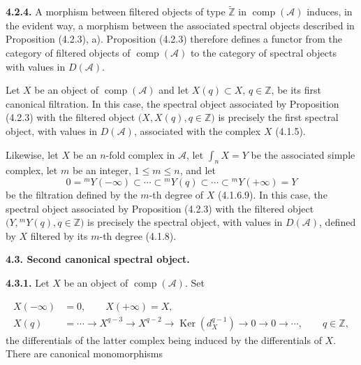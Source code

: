 \clearpage
{}%
\begingroup\small\setlength{\parskip}{0pt}\setlength{\emergencystretch}{1.5em}
\setlength{\abovedisplayskip}{4pt plus 2pt minus 2pt}%
\setlength{\belowdisplayskip}{4pt plus 2pt minus 2pt}%

\noindent\textbf{4.2.4.}\quad
A morphism between filtered objects of type $\widetilde{\mathbb Z}$ in
$\operatorname{comp}(\mathcal A)$ induces, in the evident way, a morphism
between the associated spectral objects described in Proposition (4.2.3),
a). Proposition (4.2.3) therefore defines a functor from the category of
filtered objects of $\operatorname{comp}(\mathcal A)$ to the category of
spectral objects with values in $D(\mathcal A)$.

Let $X$ be an object of $\operatorname{comp}(\mathcal A)$ and let
$X(q)\subset X$, $q\in\mathbb Z$, be its first canonical filtration. In
this case, the spectral object associated by Proposition (4.2.3) with the
filtered object $\bigl(X,X(q),q\in\mathbb Z\bigr)$ is precisely the first
spectral object, with values in $D(\mathcal A)$, associated with the
complex $X$ (4.1.5).

Likewise, let $X$ be an $n$-fold complex in $\mathcal A$, let
$\int_n X=Y$ be the associated simple complex, let $m$ be an integer,
$1\leq m\leq n$, and let
\[
0={}^{m}\!Y(-\infty)\subset\cdots\subset{}^{m}\!Y(q)
\subset\cdots\subset{}^{m}\!Y(+\infty)=Y
\]
be the filtration defined by the $m$-th degree of $X$ (4.1.6.9). In this
case, the spectral object associated by Proposition (4.2.3) with the
filtered object $\bigl(Y,{}^{m}\!Y(q),q\in\mathbb Z\bigr)$ is precisely
the spectral object, with values in $D(\mathcal A)$, defined by $X$
filtered by its $m$-th degree (4.1.8).

\medskip\noindent\textbf{4.3. Second canonical spectral object.}

\medskip\noindent\textbf{4.3.1.}\quad
Let $X$ be an object of $\operatorname{comp}(\mathcal A)$. Set

\begin{equation}
\begin{aligned}
X(-\infty)&=0,\qquad X(+\infty)=X,\\
X(q)&=\cdots\longrightarrow X^{q-3}\longrightarrow X^{q-2}
\longrightarrow\operatorname{Ker}(d_X^{q-1})
\longrightarrow0\longrightarrow0\longrightarrow\cdots,
\qquad q\in\mathbb Z,
\end{aligned}
\tag{4.3.1.1}
\end{equation}
the differentials of the latter complex being induced by the differentials
of $X$. There are canonical monomorphisms

